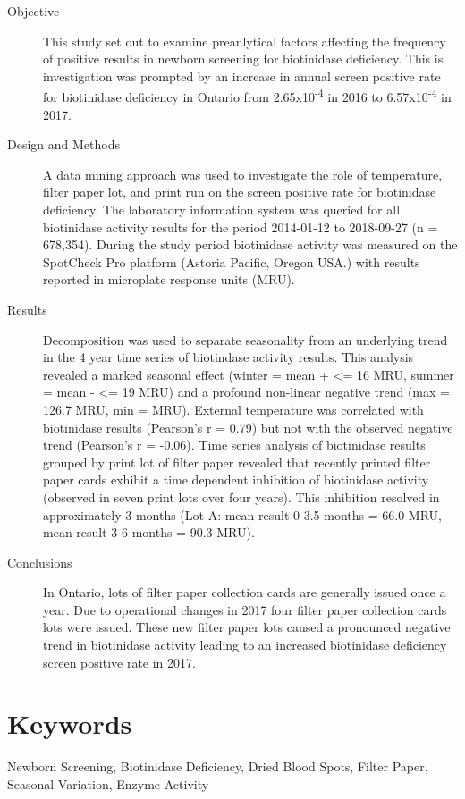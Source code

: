 \documentclass[review]{elsarticle}
\begin{document}
\begin{description}
\item[{Objective}] This study set out to examine preanlytical factors
affecting the frequency of positive results in newborn screening for
biotinidase deficiency. This is investigation was prompted by an
increase in annual screen positive rate for biotinidase deficiency
in Ontario from 2.65x10\textsuperscript{-4} in 2016 to 6.57x10\textsuperscript{-4} in 2017.

\item[{Design and Methods}] A data mining approach was used to investigate
the role of temperature, filter paper lot, and print run on the
screen positive rate for biotinidase deficiency. The laboratory
information system was queried for all biotinidase activity results
for the period 2014-01-12 to 2018-09-27 (n = 678,354). During the
study period biotinidase activity was measured on the SpotCheck Pro
platform (Astoria Pacific, Oregon USA.) with results reported in
microplate response units (MRU).

\item[{Results}] Decomposition was used to separate seasonality from an
underlying trend in the 4 year time series of biotindase activity
results. This analysis revealed a marked seasonal effect (winter =
mean + <= 16 MRU, summer = mean - <= 19 MRU) and a profound
non-linear negative trend (max = 126.7 MRU, min = MRU). External
temperature was correlated with biotinidase results (Pearson's r =
0.79) but not with the observed negative trend (Pearson's r =
-0.06). Time series analysis of biotinidase results grouped by print
lot of filter paper revealed that recently printed filter paper
cards exhibit a time dependent inhibition of biotinidase activity
(observed in seven print lots over four years). This inhibition
resolved in approximately 3 months (Lot A: mean result 0-3.5 months
= 66.0 MRU, mean result 3-6 months = 90.3 MRU).

\item[{Conclusions}] In Ontario, lots of filter paper collection cards are
generally issued once a year. Due to operational changes in 2017
four filter paper collection cards lots were issued. These new
filter paper lots caused a pronounced negative trend in biotinidase
activity leading to an increased biotinidase deficiency screen
positive rate in 2017.
\end{description}

\section*{Keywords}
\label{sec:orgf8d5148}
Newborn Screening, Biotinidase Deficiency, Dried Blood Spots, Filter
Paper, Seasonal Variation, Enzyme Activity
\end{document}
